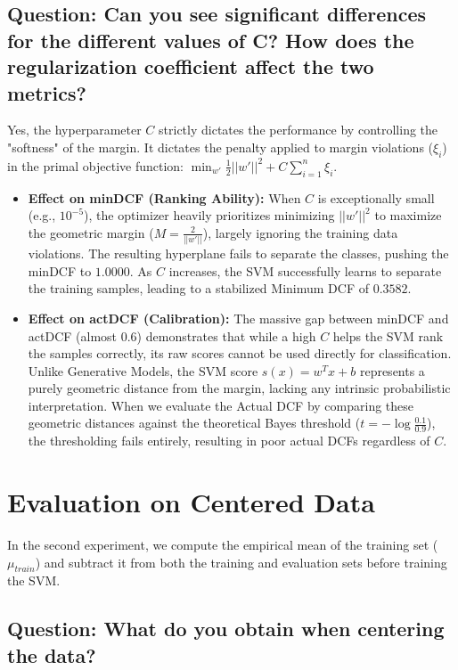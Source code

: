 \subsection*{Question: Can you see significant differences for the different values of C? How does the regularization coefficient affect the two metrics?}

Yes, the hyperparameter $C$ strictly dictates the performance by controlling the "softness" of the margin. It dictates the penalty applied to margin violations ($\xi_i$) in the primal objective function: $\min_{w'} \frac{1}{2}||w'||^2 + C \sum_{i=1}^n \xi_i$.

\begin{itemize}
    \item \textbf{Effect on minDCF (Ranking Ability):} When $C$ is exceptionally small (e.g., $10^{-5}$), the optimizer heavily prioritizes minimizing $||w'||^2$ to maximize the geometric margin ($M = \frac{2}{||w'||}$), largely ignoring the training data violations. The resulting hyperplane fails to separate the classes, pushing the minDCF to $1.0000$. As $C$ increases, the SVM successfully learns to separate the training samples, leading to a stabilized Minimum DCF of $0.3582$.
    \item \textbf{Effect on actDCF (Calibration):} The massive gap between minDCF and actDCF (almost $0.6$) demonstrates that while a high $C$ helps the SVM rank the samples correctly, its raw scores cannot be used directly for classification. Unlike Generative Models, the SVM score $s(x) = w^Tx + b$ represents a purely geometric distance from the margin, lacking any intrinsic probabilistic interpretation. When we evaluate the Actual DCF by comparing these geometric distances against the theoretical Bayes threshold ($t = -\log \frac{0.1}{0.9}$), the thresholding fails entirely, resulting in poor actual DCFs regardless of $C$.
\end{itemize}

\section{Evaluation on Centered Data}

In the second experiment, we compute the empirical mean of the training set ($\mu_{train}$) and subtract it from both the training and evaluation sets before training the SVM.

\subsection*{Question: What do you obtain when centering the data?}

